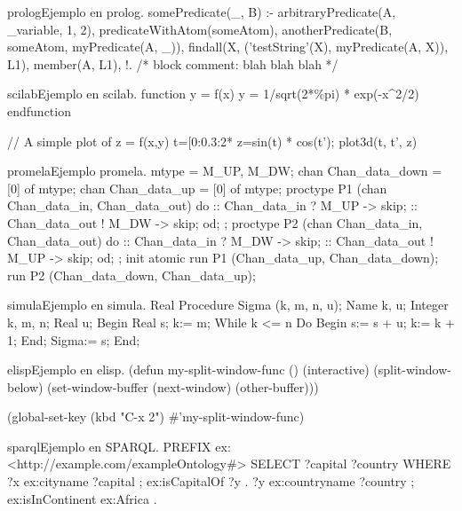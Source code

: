 \begin{sourcecode}{prolog}{Ejemplo en prolog.}
somePredicate(_, B) :-
    arbitraryPredicate(A, _variable, 1, 2),
    predicateWithAtom(someAtom),
    anotherPredicate(B, someAtom, myPredicate(A, _)),
    findall(X, ('testString'(X), myPredicate(A, X)), L1),
    member(A, L1),
    !.
    /*
    block comment: blah blah blah
    */
\end{sourcecode}

\begin{sourcecode}{scilab}{Ejemplo en scilab.}
function y = f(x)
	y = 1/sqrt(2*\%pi) * exp(-x^2/2)
endfunction

// A simple plot of z = f(x,y)
t=[0:0.3:2*%
z=sin(t) * cos(t');
plot3d(t, t', z)
\end{sourcecode}

\begin{sourcecode}{promela}{Ejemplo promela.}
mtype = {M_UP, M_DW};
chan Chan_data_down = [0] of {mtype};
chan Chan_data_up   = [0] of {mtype};
proctype P1 (chan Chan_data_in, Chan_data_out)
{
    do
    ::  Chan_data_in  ? M_UP -> skip;
    ::  Chan_data_out ! M_DW -> skip;
    od;
};
proctype P2 (chan Chan_data_in, Chan_data_out)
{
    do
    ::  Chan_data_in  ? M_DW -> skip;
    ::  Chan_data_out ! M_UP -> skip;
    od;
};
init
{
    atomic
    {
        run P1 (Chan_data_up,   Chan_data_down);
        run P2 (Chan_data_down, Chan_data_up);
    }
}
\end{sourcecode}

\begin{sourcecode}{simula}{Ejemplo en simula.}
Real Procedure Sigma (k, m, n, u);
   Name k, u;
   Integer k, m, n; Real u;
Begin
   Real s;
   k:= m;
   While k <= n Do Begin s:= s + u; k:= k + 1; End;
   Sigma:= s;
End;
\end{sourcecode}

\begin{sourcecode}{elisp}{Ejemplo en elisp.}
(defun my-split-window-func ()
  (interactive)
  (split-window-below)
  (set-window-buffer (next-window) (other-buffer)))

(global-set-key (kbd "C-x 2") #'my-split-window-func)
\end{sourcecode}

\begin{sourcecode}{sparql}{Ejemplo en SPARQL.}
PREFIX ex: <http://example.com/exampleOntology#>
SELECT ?capital
       ?country
WHERE
  {
    ?x  ex:cityname       ?capital   ;
        ex:isCapitalOf    ?y         .
    ?y  ex:countryname    ?country   ;
        ex:isInContinent  ex:Africa  .
  }
\end{sourcecode}

